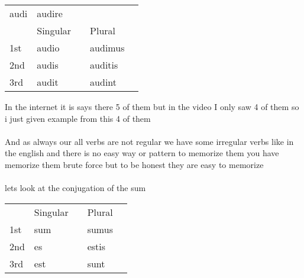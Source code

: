 \begin{center}  
  \begin{tabular}{lllll}
      audi&audire & & & \\
      & Singular  &   & Plural & \\
      1st & audio  &  & audimus &  \\
      2nd & audis &  & auditis &  \\
      3rd & audit &  & audint  &  \\
  \end{tabular}
\end{center}
In the internet it is says there 5 of them but in the video
I only saw 4 of them so i just given example from this 4 of them \\ \\

And as always our all verbs are not regular we have some irregular verbs
like in the english and there is no easy way or pattern to memorize them 
you have memorize them brute force but to be honest they are easy to memorize \\\\
lets look at the conjugation of the sum
\begin{center}  
  \begin{tabular}{lllll}
      & Singular  &   & Plural & \\
      1st & sum  &  & sumus &  \\
      2nd & es &  & estis &  \\
      3rd & est &  & sunt  &  \\
  \end{tabular}
\end{center}
